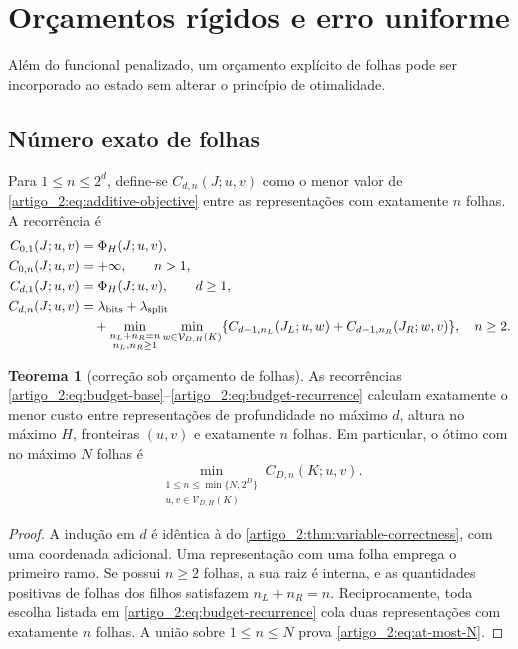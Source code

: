 \documentclass[12pt,a4paper]{article}
\theoremstyle{preciso}
\theoremstyle{definition}
\newcommand{\Values}{\mathcal{V}}
\theoremstyle{preciso}
\newtheorem{theorem}[teorema]{Teorema}
\theoremstyle{preciso}
\theoremstyle{preciso}
\theoremstyle{preciso}
\theoremstyle{definition}
\theoremstyle{preciso}
\theoremstyle{definition}
\theoremstyle{preciso}
\theoremstyle{preciso}
\theoremstyle{definition}
\begin{document}
\section{Orçamentos rígidos e erro uniforme}
\label{artigo_2:sec:hard-budgets}

Além do funcional penalizado, um orçamento explícito de folhas pode ser
incorporado ao estado sem alterar o princípio de otimalidade.

\subsection{Número exato de folhas}

Para $1\le n\le2^d$, define-se $C_{d,n}(J;u,v)$ como o menor valor de
\eqref{artigo_2:eq:additive-objective} entre as representações com exatamente $n$ folhas.
A recorrência é
\begin{align}
 C_{0,1}(J;u,v)&=\Phi_H(J;u,v),\label{artigo_2:eq:budget-base}\\
 C_{0,n}(J;u,v)&=+\infty,\qquad n>1,\notag\\
 C_{d,1}(J;u,v)&=\Phi_H(J;u,v),\qquad d\ge1,\label{artigo_2:eq:budget-one}\\
 C_{d,n}(J;u,v)&=\lambda_{\rm bits}+\lambda_{\rm split}\notag\\
 &\quad+\min_{\substack{n_L+n_R=n\\n_L,n_R\ge1}}
 \min_{w\in\Values_{D,H}(K)}
 \{C_{d-1,n_L}(J_L;u,w)+C_{d-1,n_R}(J_R;w,v)\},
 \quad n\ge2.
 \label{artigo_2:eq:budget-recurrence}
\end{align}

\begin{theorem}[correção sob orçamento de folhas]\label{map:artigo_2:8.1}
\label{artigo_2:thm:leaf-budget}
As recorrências \eqref{artigo_2:eq:budget-base}--\eqref{artigo_2:eq:budget-recurrence}
calculam exatamente o menor custo entre representações de profundidade no
máximo $d$, altura no máximo $H$, fronteiras $(u,v)$ e exatamente $n$
folhas. Em particular, o ótimo com no máximo $N$ folhas é
\begin{equation}
 \min_{\substack{1\le n\le\min\{N,2^D\}\\
                  u,v\in\Values_{D,H}(K)}}
 C_{D,n}(K;u,v).
 \label{artigo_2:eq:at-most-N}
\end{equation}
\end{theorem}

\begin{proof}
A indução em $d$ é idêntica à do
\cref{artigo_2:thm:variable-correctness}, com uma coordenada adicional. Uma
representação com uma folha emprega o primeiro ramo. Se possui $n\ge2$ folhas,
a sua raiz é interna, e as quantidades positivas de folhas dos filhos satisfazem
$n_L+n_R=n$. Reciprocamente, toda escolha listada em
\eqref{artigo_2:eq:budget-recurrence} cola duas representações com exatamente $n$
folhas. A união sobre $1\le n\le N$ prova \eqref{artigo_2:eq:at-most-N}.
\end{proof}
\end{document}
